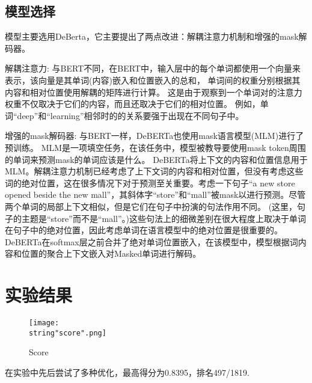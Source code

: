 \documentclass[UTF8]{ctexart}
\begin{document}
\subsection{模型选择}
模型主要选用DeBerta\cite{he2020deberta}，它主要提出了两点改进：解耦注意力机制和增强的mask解码器。\par 
解耦注意力: 与BERT不同，在BERT中，输入层中的每个单词都使用一个向量来表示，该向量是其单词(内容)嵌入和位置嵌入的总和， 单词间的权重分别根据其内容和相对位置使用解耦的矩阵进行计算。 这是由于观察到一个单词对的注意力权重不仅取决于它们的内容，而且还取决于它们的相对位置。 例如，单词“deep”和“learning”相邻时的的关系要强于出现在不同句子中。\par 
增强的mask解码器: 与BERT一样，DeBERTa也使用mask语言模型(MLM)进行了预训练。 MLM是一项填空任务，在该任务中，模型被教导要使用mask token周围的单词来预测mask的单词应该是什么。 DeBERTa将上下文的内容和位置信息用于MLM。解耦注意力机制已经考虑了上下文词的内容和相对位置，但没有考虑这些词的绝对位置，这在很多情况下对于预测至关重要。考虑一下句子“a new store opened beside the new mall”，其斜体字“store”和“mall”被mask以进行预测。尽管两个单词的局部上下文相似，但是它们在句子中扮演的句法作用不同。 (这里，句子的主题是“store”而不是“mall”。)这些句法上的细微差别在很大程度上取决于单词在句子中的绝对位置，因此考虑单词在语言模型中的绝对位置是很重要的。DeBERTa在softmax层之前合并了绝对单词位置嵌入，在该模型中，模型根据词内容和位置的聚合上下文嵌入对Masked单词进行解码。\par 



\section{实验结果}
\begin{figure}[H]
    \begin{center}
        \texttt{[image: \\string"score".png]}
    \caption{Score}
    \label{fig:5}
    \end{center}
    \end{figure}
\par
在实验中先后尝试了多种优化，最高得分为0.8395，排名497/1819.


 

\end{document}
